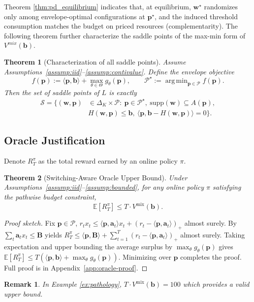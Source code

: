 \documentclass[11pt]{article}
\newtheorem{theorem}{Theorem}
\newtheorem{remark}{Remark}
\newcommand{\bB}{\mathbf{B}}
\newcommand{\bb}{\mathbf{b}}
\newcommand{\ba}{\mathbf{a}}
\newcommand{\bp}{\mathbf{p}}
\newcommand{\bw}{\mathbf{w}}
\newcommand{\E}{\mathbb{E}}
\newcommand{\cP}{\mathcal{P}}
\newcommand{\cS}{\mathcal{S}}
\DeclareMathOperator*{\argmin}{arg\,min}
\begin{document}
Theorem \ref{thm:pd_equilibrium} indicates that, at equilibrium, $\bw^\star$ randomizes only among envelope-optimal configurations at $\bp^\star$,
and the induced threshold consumption matches the budget on priced resources (complementarity). The following theorem further characterize the saddle points of the max-min form of $V^{mix}(\bb)$.
\begin{theorem}[Characterization of all saddle points]
\label{thm:all_solutions}
Assume Assumptions~\ref{assump:iid}--\ref{assump:contivalue}. Define the envelope objective
\[
f(\bp):=\langle \bp,\bb\rangle+\max_{\theta\in\Theta} g_\theta(\bp),
\qquad
\cP^\star:=\argmin_{\bp\in\cP} f(\bp).
\]
Then the set of saddle points of $L$ is exactly
\begin{align*}
\cS = \Big\{(\bw,\bp)&\in\Delta_K\times\cP:\ \bp\in\cP^\star,\ \mathrm{supp}(\bw)\subseteq A(\bp), \\
&H(\bw,\bp)\le \bb,\ \langle \bp,\bb-H(\bw,\bp)\rangle=0 \Big\}.
\end{align*}
\end{theorem}
\subsection{Oracle Justification}
Denote $R_T^{\pi}$ as the total reward earned by an online policy $\pi$.
\begin{theorem}[Switching-Aware Oracle Upper Bound]
\label{thm:oracle-upper-bound}
Under Assumptions~\ref{assump:iid}--\ref{assump:bounded}, for any online policy $\pi$ satisfying the pathwise budget constraint,
\[
\E[R_T^\pi] \le T \cdot V^{\mathrm{mix}}(\bb).
\]
\end{theorem}
\begin{proof}[Proof sketch]
Fix $\bp\in\cP$, $r_t x_t\le \langle \bp,\ba_t\rangle x_t + (r_t-\langle \bp,\ba_t\rangle)_+$ almost surely.
By $\sum_t \ba_t x_t\le \bB$ yields $R_T^\pi\le \langle \bp,\bB\rangle + \sum_{t=1}^T (r_t-\langle \bp,\ba_t\rangle)_+$ almost surely.
Taking expectation and upper bounding the average surplus by $\max_\theta g_\theta(\bp)$ gives $\E[R_T^\pi]\le T(\langle \bp,\bb\rangle+\max_\theta g_\theta(\bp))$. Minimizing over $\bp$ completes the proof. Full proof is in Appendix~\ref{app:oracle-proof}.
\end{proof}
\begin{remark}
    In Example \ref{ex:pathology}, $T \cdot V^{\mathrm{mix}}(\bb)=100$ which provides a valid upper bound. 
\end{remark}
\end{document}

